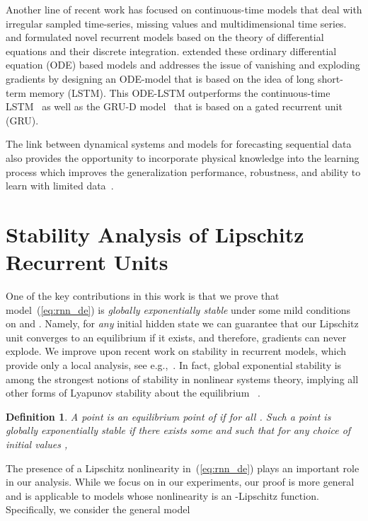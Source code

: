 \documentclass{article} \usepackage{iclr2021_conference,times}
\newtheorem{definition}{Definition}
\begin{document}
Another line of recent work has focused on continuous-time models that deal with irregular sampled time-series, missing values and multidimensional time series. \citet{rubanova2019latent} and \citet{NIPS2019_8957} formulated novel recurrent models based on the theory of differential equations and their discrete integration. \cite{lechner2020learning} extended these ordinary differential equation (ODE) based models and addresses the issue of vanishing and exploding gradients by designing an ODE-model that is based on the idea of long short-term memory (LSTM). This ODE-LSTM outperforms the continuous-time LSTM~\citep{mei2017neural} as well as the GRU-D model~\citep{che2018recurrent} that is based on a gated recurrent unit (GRU).

The link between dynamical systems and models for forecasting sequential data also provides the opportunity to incorporate physical knowledge into the learning process which improves the generalization performance, robustness, and ability to learn with limited data~\citep{chen2019symplectic}.


\section{Stability Analysis of Lipschitz Recurrent Units}
\label{sec:Stability}

One of the key contributions in this work is that we prove that model~(\ref{eq:rnn_de}) is \emph{globally exponentially stable} under some mild conditions on  and . Namely, for \emph{any} initial hidden state we can guarantee that our Lipschitz unit converges to an equilibrium if it exists, and therefore, gradients can never explode. We improve upon recent work on stability in recurrent models, which provide only a local analysis, see e.g.,~\citep{chang2018antisymmetricrnn}. In fact, global exponential stability is among the strongest notions of stability in nonlinear systems theory, implying all other forms of Lyapunov stability about the equilibrium ~\cite[Definitions 4.4 and 4.5]{khalil2002nonlinear}. 
\begin{definition}
A point  is an \emph{equilibrium point} of  if  for all . Such a point is \emph{globally exponentially stable} if there exists some  and  such that for any choice of initial values ,

\end{definition}
The presence of a Lipschitz nonlinearity in~(\ref{eq:rnn_de}) plays an important role in our analysis. While we focus on  in our experiments, our proof is more general and is applicable to models whose nonlinearity  is an -Lipschitz function. Specifically, we consider the general model
\end{document}
